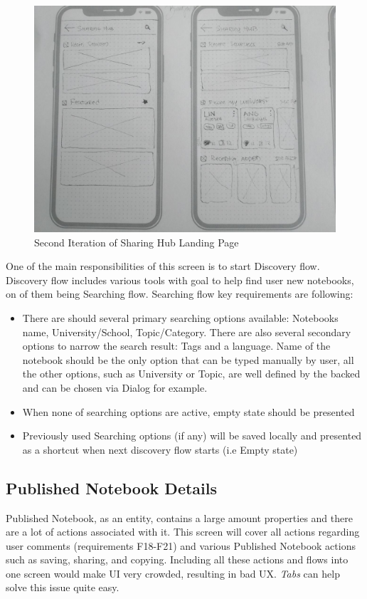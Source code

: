 \documentclass[thesis=B,english]{FITthesis}[2012/10/20]
\begin{document}
\begin{figure}[H]
\centering
  \includegraphics[scale=0.28]{SharingHubV2Sketch}
  \caption{Second Iteration of Sharing Hub Landing Page}
  \label{fig:section-sharinghubv2sletch}
\end{figure}



 One of the main responsibilities of this screen is to start Discovery flow. Discovery flow includes various tools with goal to help find user new notebooks, on of them being Searching flow. Searching flow key requirements are following:
 \begin{itemize}
 
 \item There are should several primary searching options available: Notebooks name, University/School, Topic/Category. There are also several secondary options to narrow the search result: Tags and a language. Name of the notebook should be the only option that can be typed manually by user, all the other options, such as University or Topic, are well defined by the backed and can be chosen via Dialog for example.
 \item When none of searching options are active, empty state should be presented
 \item Previously used Searching options (if any) will be saved locally and presented as a shortcut when next discovery flow starts (i.e Empty state)
 \end{itemize}

   

 
\subsection{Published Notebook Details}
Published Notebook, as an entity, contains a large amount properties and there are a lot of actions associated with it. This screen will cover all actions regarding user comments (requirements F18-F21) and various Published Notebook actions such as saving, sharing, and copying. Including all these actions and flows into one screen would make UI very crowded, resulting in bad UX. \textit{Tabs} can help solve this issue quite easy.
\end{document}
